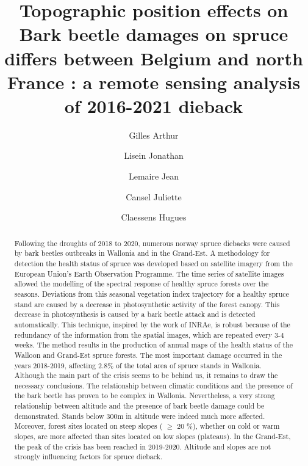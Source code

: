 \documentclass[3p,procedia]{elsarticle}
\begin{document}
\begin{frontmatter}

\author[label2]{Gilles Arthur}
\author[label2]{Lisein Jonathan}
\author[label3]{Lemaire Jean}
\author[label3]{Cansel Juliette}
\author[label2]{Claessens Hugues}



\title{Topographic position effects on Bark beetle damages on spruce differs between Belgium and north France : a remote sensing analysis of 2016-2021 dieback}

\begin{abstract}
Following the droughts of 2018 to 2020, numerous norway spruce diebacks were caused by bark beetles 
outbreaks in Wallonia and in the Grand-Est. 
A methodology for detection the health status of spruce was developed based on satellite imagery from the European Union's Earth Observation Programme.
The time series of satellite images allowed the modelling of the spectral response of healthy spruce forests over the seasons. Deviations from this seasonal vegetation index trajectory for a healthy spruce stand are caused by a decrease in photosynthetic activity of the forest canopy.
This decrease in photosynthesis is caused by a bark beetle attack and is detected automatically.
This technique, inspired by the work of INRAe, is robust because of the redundancy of the information from the spatial images, which are repeated every 3-4 weeks. 
The method results in the production of annual maps of the health status of the Walloon and Grand-Est spruce forests.
The most important damage occurred in the years 2018-2019, affecting 2.8\% of the total area of spruce stands in Wallonia.
Although the main part of the crisis seems to be behind us, it remains to draw the necessary conclusions.
The relationship between climatic conditions and the presence of the bark beetle has proven to be complex in Wallonia.
Nevertheless, a very strong relationship between altitude and the presence of bark beetle damage could be demonstrated.
Stands below 300m in altitude were indeed much more affected.
Moreover, forest sites located on steep slopes ( $\ge$  20 \%), whether on cold or warm slopes, are more affected than sites located on low slopes (plateaus).
In the Grand-Est, the peak of the crisis has been reached in 2019-2020. Altitude and slopes are not strongly influencing factors for spruce dieback. 


\end{abstract}

\begin{keyword}
\end{keyword}

\end{frontmatter}
\end{document}
